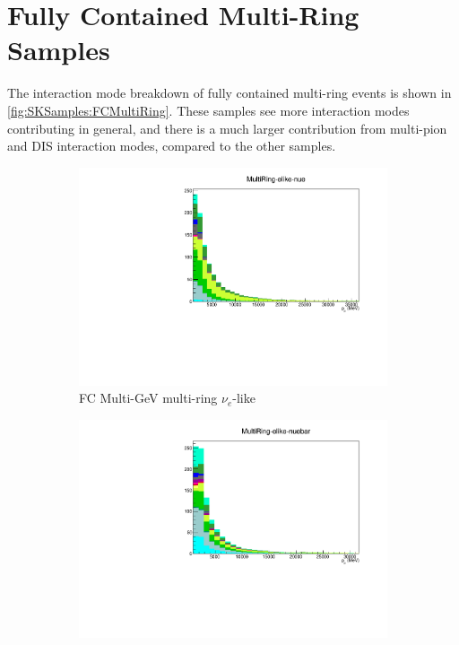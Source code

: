 \clearpage
\section{Fully Contained Multi-Ring Samples}

The interaction mode breakdown of fully contained multi-ring events is shown in \autoref{fig:SKSamples:FCMultiRing}. These samples see more interaction modes contributing in general, and there is a much larger contribution from multi-pion and DIS interaction modes, compared to the other samples.

\begin{figure}[ht]
    \begin{subfigure}[t]{0.49\textwidth}
    \includegraphics[width=\textwidth, trim= 0 0 0 30, clip]{Figures/Selections/AtmosphericByMode/MultiRing-elike-nue_LepMom.pdf}
    \caption{FC Multi-GeV multi-ring $\nu_e$-like}
    \end{subfigure}
    \begin{subfigure}[t]{0.49\textwidth}
    \includegraphics[width=\textwidth, trim= 0 0 0 30, clip]{Figures/Selections/AtmosphericByMode/MultiRing-elike-nuebar_LepMom.pdf}

\end{subfigure}
\end{figure}
